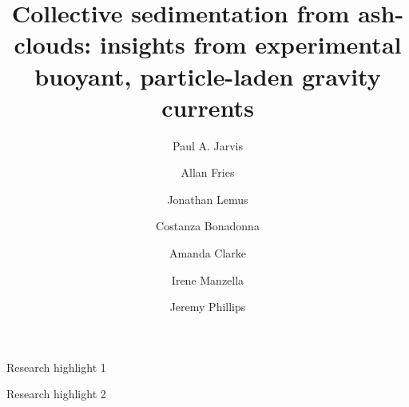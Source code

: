 \documentclass[authoryear,preprint,review,12pt]{elsarticle}
\begin{document}
\begin{frontmatter}



\title{Collective sedimentation from ash-clouds: insights from experimental buoyant, particle-laden gravity currents}


\author[label1]{Paul A. Jarvis}
\author[label1]{Allan Fries}
\author[label1]{Jonathan Lemus}
\author[label1]{Costanza Bonadonna}
\author[label2]{Amanda Clarke}
\author[label3]{Irene Manzella}
\author[label4]{Jeremy Phillips}

\address[label1]{Department of Earth Sciences, University of Geneva, Rue des Mar{\"i}chers, Geneva, 1205, Switzerland}
\address[label2]{School of Earth and Space Exploration, Arizona State University, ISTB4-BLDG75, 781 E Terrance Mall, Tempe, AZ, 85287-6004, USA}
\address[label3]{School of Geography, Earth and Envrionmental Sciences, Univeristy of Plymouth, Drake Circus, Plymouth, PL4 8AA, UK}
\address[label4]{School of Earth Sciences, University of Bristol, Wills Memorial Building, Queens Road, Bristol, BS8 1RJ, UK}

\begin{abstract}

\end{abstract}

\begin{graphicalabstract}
\end{graphicalabstract}

\begin{highlights}
\item Research highlight 1
\item Research highlight 2
\end{highlights}


\end{frontmatter}
\end{document}
